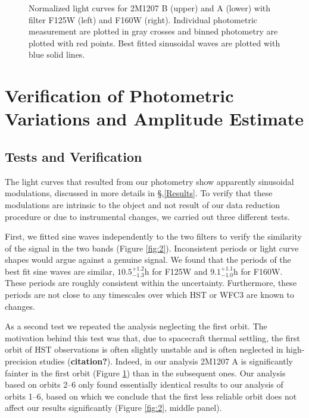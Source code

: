 \documentclass[apj]{emulateapj}
\begin{document}
  \begin{figure}
  \centering
  \caption{Normalized light curves for 2M1207 B (upper) and A (lower)
    with filter F125W (left) and F160W (right). Individual photometric
  measurement are plotted in gray crosses and binned photometry are
  plotted with red points. Best fitted sinusoidal waves are plotted
  with blue solid lines.}
  \label{fig:3}
\end{figure}

\section{Verification of Photometric Variations and Amplitude
  Estimate}

\subsection{Tests and Verification}

The light curves that resulted from our photometry show apparently
sinusoidal modulations, discussed in more details in
\S,\ref{Results}. To verify that these modulations are intrinsic to
the object and not result of our data reduction procedure or due to
instrumental changes, we carried out three different tests.

First, we fitted sine waves independently to the two filters to verify
the similarity of the signal in the two bands (Figure \ref{fig:2}). Inconsistent periods or
light curve shapes would argue against a genuine signal.  We found
that the periods of the best fit sine waves are similar,
$10.5^{+1.2}_{-1.3}$h for F125W and $9.1^{+1.1}_{-1.0}$h for
F160W. These periods are roughly consistent within the
uncertainty. Furthermore, these periods are not close to any
timescales over which HST or WFC3 are known to changes.

 As a second test we repeated the analysis neglecting the first
 orbit. The motivation behind this test was that, due to spacecraft
 thermal settling, the first orbit of HST observations is often
 slightly unstable and is often neglected in high-precision studies
 (\textbf{citation?}). Indeed, in our analysis 2M1207 A is
 significantly fainter in the first orbit (Figure \ref{fig:3}) than in
 the subsequent ones.
 Our analysis based on orbits 2--6 only found essentially identical
 results to our analysis of orbits 1--6, based on which we conclude
 that the first less reliable orbit does not affect our results
 significantly (Figure \ref{fig:2}, middle panel).
\end{document}
